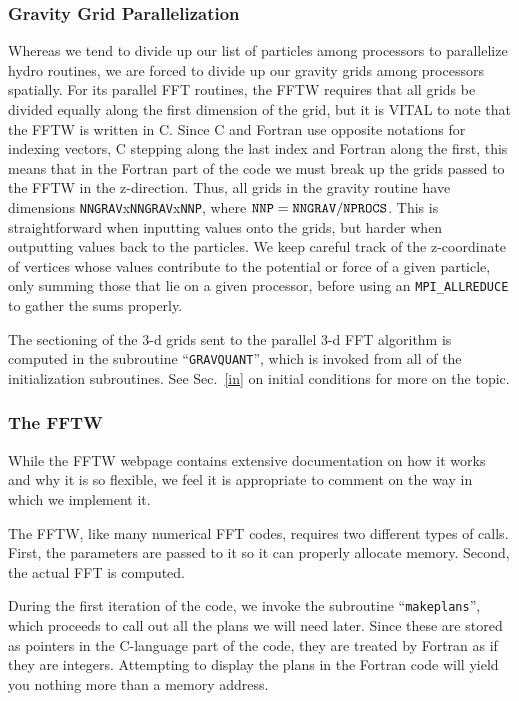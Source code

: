 \subsubsection{Gravity Grid Parallelization}
\label{nm:gr:pa}
Whereas we tend to divide up our list of particles among processors
to parallelize hydro routines, we are forced to divide up our gravity
grids among processors spatially.  For its parallel FFT routines,
the FFTW requires that all grids be divided equally along the first
dimension of the grid, but it is VITAL to note that the FFTW is
written in C.  Since C and Fortran use opposite notations for indexing
vectors, C stepping along the last index and Fortran along the first,
this means that in the Fortran part of the code we must break up the
grids passed to the FFTW in the z-direction.  Thus, all grids in the
gravity routine have dimensions {\tt NNGRAV}x{\tt NNGRAV}x{\tt NNP}, where
${\tt NNP}={\tt NNGRAV}/{\tt NPROCS}$.  This is straightforward when
inputting values onto the grids, but harder when outputting values
back to the particles.  We keep careful track of the z-coordinate of
vertices whose values contribute to the potential or force of a given
particle, only summing those that lie on a given processor, before
using an {\tt MPI\_ALLREDUCE} to gather the sums properly.

The sectioning of the 3-d grids sent to the parallel 3-d FFT algorithm
is computed in the subroutine ``{\tt GRAVQUANT}'', which is invoked
from all of the initialization subroutines.  See Sec.~\ref{in} on initial
conditions for more on the topic.

\subsubsection{The FFTW}
\label{nm:gr:fftw}
While the FFTW webpage contains extensive documentation on how it
works and why it is so flexible, we feel it is appropriate to comment
on the way in which we implement it.

The FFTW, like many numerical FFT codes, requires two different types
of calls.  First, the parameters are passed to it so it can properly
allocate memory.  Second, the actual FFT is computed.

During the first iteration of the code, we invoke the subroutine
``{\tt makeplans}'', which proceeds to call out all the plans we will
need later.  Since these are stored as pointers in the C-language part
of the code, they are treated by Fortran as if they are integers.
Attempting to display the plans in the Fortran code will yield you
nothing more than a memory address.

